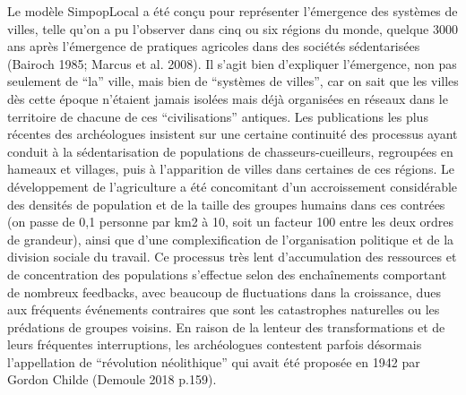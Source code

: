 \documentclass[10pt]{article}
\begin{document}
Le modèle SimpopLocal a été conçu pour représenter l’émergence des systèmes de villes, telle qu’on a pu l’observer dans cinq ou six régions du monde, quelque 3000 ans après l’émergence de pratiques agricoles dans des sociétés sédentarisées (Bairoch 1985; Marcus et al. 2008). Il s’agit bien d’expliquer l’émergence, non pas seulement de “la” ville, mais bien de “systèmes de villes”, car on sait que les villes dès cette époque n’étaient jamais isolées mais déjà organisées en réseaux dans le territoire de chacune de ces “civilisations” antiques. Les publications les plus récentes des archéologues insistent sur une certaine continuité des processus ayant conduit à la sédentarisation de populations de chasseurs-cueilleurs, regroupées en hameaux et villages, puis à l’apparition de villes dans certaines de ces régions. Le développement de l’agriculture a été concomitant d’un accroissement considérable des densités de population et de la taille des groupes humains dans ces contrées (on passe de 0,1 personne par km2 à 10, soit un facteur 100 entre les deux ordres de grandeur), ainsi que d’une complexification de l’organisation politique et de la division sociale du travail. Ce processus très lent d’accumulation des ressources et de concentration des populations s’effectue selon des enchaînements comportant de nombreux feedbacks, avec beaucoup de fluctuations dans la croissance, dues aux fréquents événements contraires que sont les catastrophes naturelles ou les prédations de groupes voisins. En raison de la lenteur des transformations et de leurs fréquentes interruptions, les archéologues contestent parfois désormais l’appellation de “révolution néolithique” qui avait été proposée en 1942 par Gordon Childe (Demoule 2018 p.159). 
\end{document}

